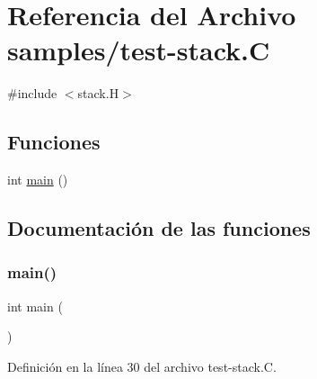 \hypertarget{test-stack_8_c}{}\section{Referencia del Archivo samples/test-\/stack.C}
\label{test-stack_8_c}
{\ttfamily \#include $<$stack.\+H$>$}\newline
\subsection*{Funciones}
\begin{DoxyCompactItemize}
\item 
int \hyperlink{test-stack_8_c_ae66f6b31b5ad750f1fe042a706a4e3d4}{main} ()
\end{DoxyCompactItemize}


\subsection{Documentación de las funciones}
\mbox{\label{test-stack_8_c_ae66f6b31b5ad750f1fe042a706a4e3d4}} 
\subsubsection{\texorpdfstring{main()}{main()}}
{\footnotesize\ttfamily int main (\begin{DoxyParamCaption}{ }\end{DoxyParamCaption})}



Definición en la línea 30 del archivo test-\/stack.\+C.

